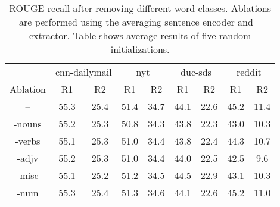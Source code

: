 \begin{table*}
\center
\begin{tabular}{| c || c | c | c | c | c | c | c | c |}
\hline
    & \multicolumn{2}{|c|}{cnn-dailymail} & \multicolumn{2}{|c|}{nyt} & \multicolumn{2}{|c|}{duc-sds} & \multicolumn{2}{|c|}{reddit} \\
Ablation & R1 & R2  & R1 & R2  & R1 & R2  & R1 & R2  \\
\hline
 --  & 55.3 & 25.4 & 51.4 & 34.7 & 44.1 & 22.6 & 45.2 & 11.4\\
\hline
-nouns  & 55.2 & 25.3 & 50.8 & 34.3 & 43.8 & 22.3 & 43.0 & 10.3\\
\hline
-verbs  & 55.1 & 25.3 & 51.0 & 34.4 & 43.8 & 22.4 & 44.3 & 10.7\\
\hline
-adjv  & 55.2 & 25.3 & 51.0 & 34.4 & 44.0 & 22.5 & 42.5 & 9.6\\
\hline
-misc  & 55.1 & 25.2 & 51.2 & 34.5 & 44.5 & 22.9 & 43.1 & 10.3\\
\hline
-num  & 55.3 & 25.4 & 51.3 & 34.6 & 44.1 & 22.6 & 45.2 & 11.0\\
\hline
\end{tabular}
\caption{ROUGE recall after removing different word classes. Ablations are
    performed using the averaging sentence encoder and \modelOneBF~
extractor. Table shows average results of five random initializations.}
\label{tab:ablations}
\end{table*}
